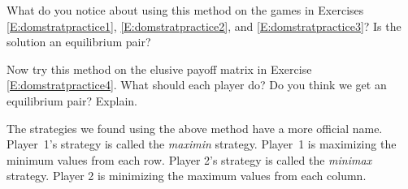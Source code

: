 \begin{xca}
What do you notice about using this method on the games in Exercises   \ref{E:domstratpractice1},  \ref{E:domstratpractice2}, and \ref{E:domstratpractice3}? Is the solution an equilibrium pair?
\end{xca}

\begin{xca}
Now try this method on the elusive payoff matrix in Exercise  \ref{E:domstratpractice4}. What should each player do? Do you think we get an equilibrium pair? Explain.
\end{xca}



 The strategies we found using the above method have a more official name. Player~1's strategy is called the \emph{maximin} strategy. Player~1 is maximizing the minimum values from each row. Player 2's strategy is called the \emph{minimax} strategy. Player 2 is minimizing the maximum values from each column. 





